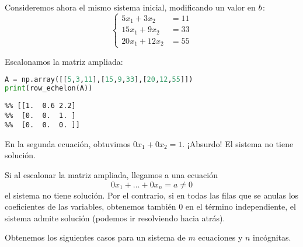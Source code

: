 \begin{ejemplo}
Consideremos ahora el mismo sistema inicial, modificando un valor en $\bb$:
$$
\left\{
\begin{aligned}
5x_1 + 3x_2 &= 11 \\
15x_1 + 9x_2 &= 33 \\
20x_1 + 12x_2 &= 55
\end{aligned}
\right.
$$


Escalonamos la matriz ampliada:
\begin{Shaded}
\begin{lstlisting}[language=Python]
A = np.array([[5,3,11],[15,9,33],[20,12,55]])
print(row_echelon(A))
\end{lstlisting}
\end{Shaded}

\begin{verbatim}
%% [[1.  0.6 2.2]
%%  [0.  0.  1. ]
%%  [0.  0.  0. ]]
\end{verbatim}

En la segunda ecuación, obtuvimos $0x_1 + 0x_2 = 1$. ¡Absurdo! El
sistema no tiene solución.
\end{ejemplo}

Si al escalonar la matriz ampliada, llegamos a una ecuación
$$
0 x_1 + \dots + 0x_n = a \neq 0
$$
el sistema no tiene solución. Por el contrario, si en todas las filas
que se anulas los coeficientes de las variables, obtenemos también $0$
en el término independiente, el sistema admite solución (podemos ir
resolviendo hacia atrás).

Obtenemos los siguientes casos para un sistema de $m$ ecuaciones y $n$ incógnitas.

